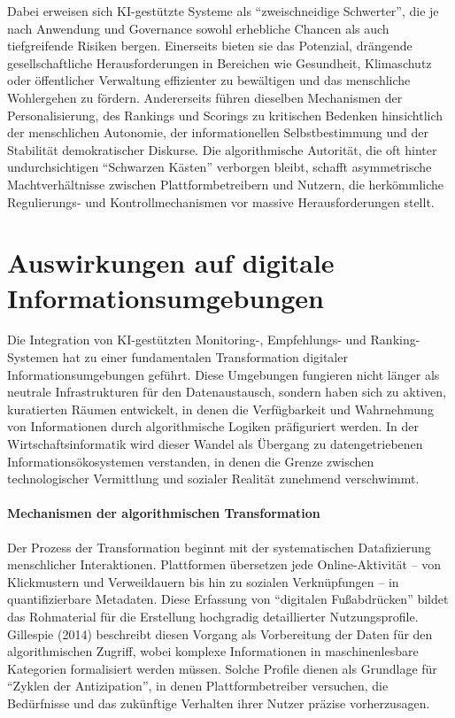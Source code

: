 Dabei erweisen sich \ac{KI}-gestützte Systeme als \enquote{zweischneidige Schwerter}, die je nach Anwendung und Governance sowohl erhebliche Chancen als auch tiefgreifende Risiken bergen. Einerseits bieten sie das Potenzial, drängende gesellschaftliche Herausforderungen in Bereichen wie Gesundheit, Klimaschutz oder öffentlicher Verwaltung effizienter zu bewältigen und das menschliche Wohlergehen zu fördern. Andererseits führen dieselben Mechanismen der Personalisierung, des Rankings und Scorings zu kritischen Bedenken hinsichtlich der menschlichen Autonomie, der informationellen Selbstbestimmung und der Stabilität demokratischer Diskurse. Die algorithmische Autorität, die oft hinter undurchsichtigen \enquote{Schwarzen Kästen} verborgen bleibt, schafft asymmetrische Machtverhältnisse zwischen Plattformbetreibern und Nutzern, die herkömmliche Regulierungs- und Kontrollmechanismen vor massive Herausforderungen stellt.

\section{Auswirkungen auf digitale Informationsumgebungen}

Die Integration von \ac{KI}-gestützten Monitoring-, Empfehlungs- und Ranking-Systemen hat zu einer fundamentalen Transformation digitaler Informationsumgebungen geführt. Diese Umgebungen fungieren nicht länger als neutrale Infrastrukturen für den Datenaustausch, sondern haben sich zu aktiven, kuratierten Räumen entwickelt, in denen die Verfügbarkeit und Wahrnehmung von Informationen durch algorithmische Logiken präfiguriert werden. In der Wirtschaftsinformatik wird dieser Wandel als Übergang zu datengetriebenen Informationsökosystemen verstanden, in denen die Grenze zwischen technologischer Vermittlung und sozialer Realität zunehmend verschwimmt.

\paragraph{Mechanismen der algorithmischen Transformation}

Der Prozess der Transformation beginnt mit der systematischen Datafizierung menschlicher Interaktionen. Plattformen übersetzen jede Online-Aktivität -- von Klickmustern und Verweildauern bis hin zu sozialen Verknüpfungen -- in quantifizierbare Metadaten. Diese Erfassung von \enquote{digitalen Fußabdrücken} bildet das Rohmaterial für die Erstellung hochgradig detaillierter Nutzungsprofile. Gillespie (2014) beschreibt diesen Vorgang als Vorbereitung der Daten für den algorithmischen Zugriff, wobei komplexe Informationen in maschinenlesbare Kategorien formalisiert werden müssen. Solche Profile dienen als Grundlage für \enquote{Zyklen der Antizipation}, in denen Plattformbetreiber versuchen, die Bedürfnisse und das zukünftige Verhalten ihrer Nutzer präzise vorherzusagen.


